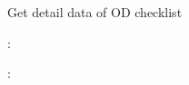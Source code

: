 \documentclass[letterpaper,10pt,english,openany,oneside]{sphinxmanual}
\begin{document}
\begin{fulllineitems}
\label{\detokenize{api-checklist/v1:post--api-checklist-v1-od-list}}
\sphinxAtStartPar
Get detail data of OD checklist

\sphinxAtStartPar
{}:

\begin{sphinxVerbatim}[commandchars=\\\{\}]
   
\end{sphinxVerbatim}

\sphinxAtStartPar
{}:


\end{fulllineitems}
\end{document}
